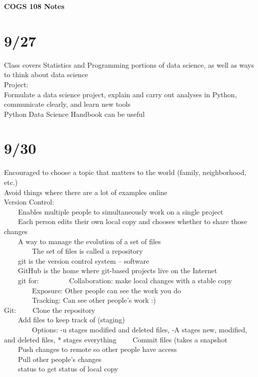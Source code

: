 \documentclass[10pt,letterpaper,unboxed,cm]{article}
\newcommand{\tab}{~~~~}
\begin{document}
\begin{center}
    \textbf{\Large{COGS 108 Notes}}
\end{center}
\section{9/27}
Class covers Statistics and Programming portions of data science, as well as ways to think about data science\\
Project:\\
Formulate a data science project, explain and carry out analyses in Python, communicate clearly, and learn new tools\\
Python Data Science Handbook can be useful\\

\section{9/30}
Encouraged to choose a topic that matters to the world (family, neighborhood, etc.)\\
Avoid things where there are a lot of examples online\\
Version Control:\\
\tab Enables multiple people to simultaneously work on a single project\\
\tab Each person edits their own local copy and chooses whether to share those changes\\
\tab A way to manage the evolution of a set of files\\
\tab \tab The set of files is called a repository\\
\tab git is the version control system -- software\\
\tab GitHub is the home where git-based projects live on the Internet\\
\tab git for: 
\tab \tab Collaboration: make local changes with a stable copy\\
\tab \tab Exposure: Other people can see the work you do\\
\tab \tab Tracking: Can see other people's work :)\\
Git: 
\tab Clone the repository\\
\tab Add files to keep track of (staging)\\
\tab \tab Options: -u stages modified and deleted files, -A stages new, modified, and deleted files, * stages everything
\tab Commit files (takes a snapshot\\
\tab Push changes to remote so other people have access\\
\tab Pull other people's changes\\
\tab status to get status of local copy\\
\end{document}
